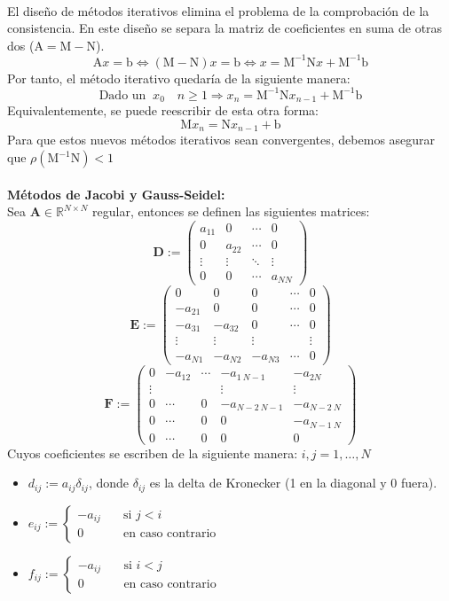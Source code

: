 \documentclass{article}
\begin{document}
\hrulefill
\\
El diseño de métodos iterativos elimina el problema de la comprobación de la consistencia. En este diseño se separa la matriz de coeficientes en suma de otras dos ($\text{A}=\text{M}-\text{N}$).
$$\text{A}x=\text{b}\Leftrightarrow(\text{M}-\text{N})x=\text{b}\Leftrightarrow x=\text{M}^{-1}\text{N}x+\text{M}^{-1}\text{b}$$
Por tanto, el método iterativo quedaría de la siguiente manera:
$$\text{Dado un }\:x_0\quad n\geq 1\Rightarrow x_n=\text{M}^{-1}\text{N}x_{n-1}+\text{M}^{-1}\text{b}$$
Equivalentemente, se puede reescribir de esta otra forma:
$$\text{M}x_n=\text{N}x_{n-1}+\text{b}$$
Para que estos nuevos métodos iterativos sean convergentes, debemos asegurar que $\rho(\text{M}^{-1}\text{N})<1$
\\
\\
\textbf{Métodos de Jacobi y Gauss-Seidel:}
\\
Sea $\textbf{A}\in\mathbb{R}^{N\times N}$ regular, entonces se definen las siguientes matrices:
$$\textbf{D}:=\begin{pmatrix}
a_{11} & 0 & \cdots & 0 \\
0 & a_{22} & \cdots & 0 \\
\vdots & \vdots & \ddots & \vdots \\
0 & 0 & \cdots & a_{NN}
\end{pmatrix}$$
$$\textbf{E}:=\begin{pmatrix}
0 & 0 & 0 & \cdots & 0 \\
-a_{21} & 0 & 0 & \cdots & 0 \\
-a_{31} & -a_{32} & 0 & \cdots & 0 \\
\vdots & \vdots & \vdots & & \vdots \\
-a_{N1} & -a_{N2} & -a_{N3} & \cdots & 0
\end{pmatrix}$$
$$\textbf{F}:=\begin{pmatrix}
0 & -a_{12} & \cdots & -a_{1\:N-1} & -a_{2N} \\
\vdots &  &  & \vdots & \vdots \\
0 & \cdots & 0 & -a_{N-2\:N-1} & -a_{N-2\:N} \\
0 & \cdots & 0 & 0 & -a_{N-1\:N} \\
0 & \cdots & 0 & 0 & 0
\end{pmatrix}$$
Cuyos coeficientes se escriben de la siguiente manera: $i,j=1,\dots,N$
\begin{itemize}
\item $d_{ij}:=a_{ij}\delta_{ij}$, donde $\delta_{ij}$ es la delta de Kronecker (1 en la diagonal y 0 fuera).
\item $e_{ij}:=\begin{cases}
-a_{ij} & \quad \text{si }j<i\\
0 & \quad \text{en caso contrario}
\end{cases}$
\item $f_{ij}:=\begin{cases}
-a_{ij} & \quad \text{si }i<j\\
0 & \quad \text{en caso contrario}
\end{cases}$
\end{itemize}
\end{document}
